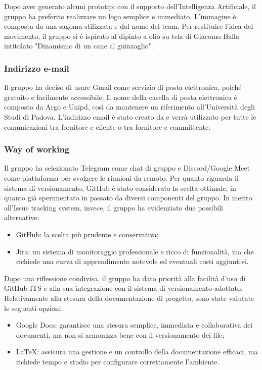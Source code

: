 Dopo aver generato alcuni prototipi con il supporto dell’Intelligenza Artificiale, il gruppo ha preferito realizzare un logo semplice e immediato. L’immagine è composta da una sagoma stilizzata e dal nome del team. Per restituire l’idea del movimento, il gruppo si è ispirato al dipinto a olio su tela di Giacomo Balla intitolato "Dinamismo di un cane al guinzaglio".

\subsubsection{Indirizzo e-mail}
Il gruppo ha deciso di usare Gmail come servizio di posta elettronica, poiché gratuito e facilmente accessibile. Il nome della casella di posta elettronica è composto da Argo e Unipd, così da mantenere un riferimento all’Università degli Studi di Padova. L’indirizzo email è stato creato da \martina{} e verrà utilizzato per tutte le comunicazioni tra fornitore e cliente o tra fornitore e committente.

\subsubsection{Way of working}
Il gruppo ha selezionato Telegram come chat di gruppo e Discord/Google Meet come piattaforma per svolgere le riunioni da remoto. Per quanto riguarda il sistema di versionamento, GitHub è stato considerato la scelta ottimale, in quanto già sperimentato in passato da diversi componenti del gruppo. In merito all’Issue tracking system, invece, il gruppo ha evidenziato due possibili alternative:
\begin{itemize}
	\item GitHub: la scelta più prudente e conservativa;
	\item Jira: un sistema di monitoraggio professionale e ricco di funzionalità, ma che richiede una curva di apprendimento notevole ed eventuali costi aggiuntivi.
\end{itemize}

Dopo una riflessione condivisa, il gruppo ha dato priorità alla facilità d'uso di GitHub ITS e alla sua integrazione con il sistema di versionamento adottato.
Relativamente alla stesura della documentazione di progetto, sono state valutate le seguenti opzioni:
\begin{itemize}
	\item Google Docs: garantisce una stesura semplice, immediata e collaborativa dei documenti, ma non si armonizza bene con il versionamento dei file;
	\item LaTeX: assicura una gestione e un controllo della documentazione efficaci, ma richiede tempo e studio per configurare correttamente l’ambiente.
\end{itemize}

